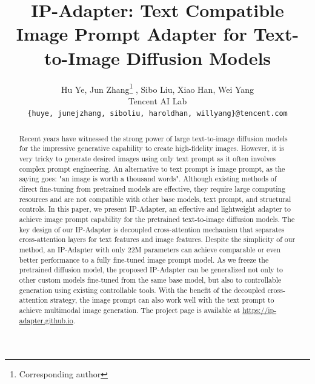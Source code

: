 \documentclass{article}
\title{IP-Adapter: Text Compatible Image Prompt Adapter for Text-to-Image Diffusion Models
}
\author{
  Hu Ye,  Jun Zhang{\hypersetup{hidelinks}\thanks{Corresponding author}} , Sibo Liu,  Xiao Han,  Wei Yang \\
  Tencent AI Lab \\
  \texttt{\{huye, junejzhang, siboliu, haroldhan, willyang\}@tencent.com} \\
}
\begin{document}
\maketitle


\begin{abstract}
Recent years have witnessed the strong power of large text-to-image diffusion models for the impressive generative capability to create high-fidelity images. However, it is very tricky to generate desired images using only text prompt as it often involves complex prompt engineering. An alternative to text prompt is image prompt, as the saying goes: "an image is worth a thousand words". Although existing methods of direct fine-tuning from pretrained models are effective, they require large computing resources and are not compatible with other base models, text prompt, and structural controls. In this paper, we present IP-Adapter, an effective and lightweight adapter to achieve image prompt capability for the pretrained text-to-image diffusion models. The key design of our IP-Adapter is decoupled cross-attention mechanism that separates cross-attention layers for text features and image features. Despite the simplicity of our method, an IP-Adapter with only 22M parameters can achieve comparable or even better performance to a fully fine-tuned image prompt model. As we freeze the pretrained diffusion model, the proposed IP-Adapter can be generalized not only to other custom models fine-tuned from the same base model, but also to controllable generation using existing controllable tools. With the benefit of the decoupled cross-attention strategy, the image prompt can also work well with the text prompt to achieve multimodal image generation. The project page is available at \url{https://ip-adapter.github.io}.
\end{abstract}


\end{document}
